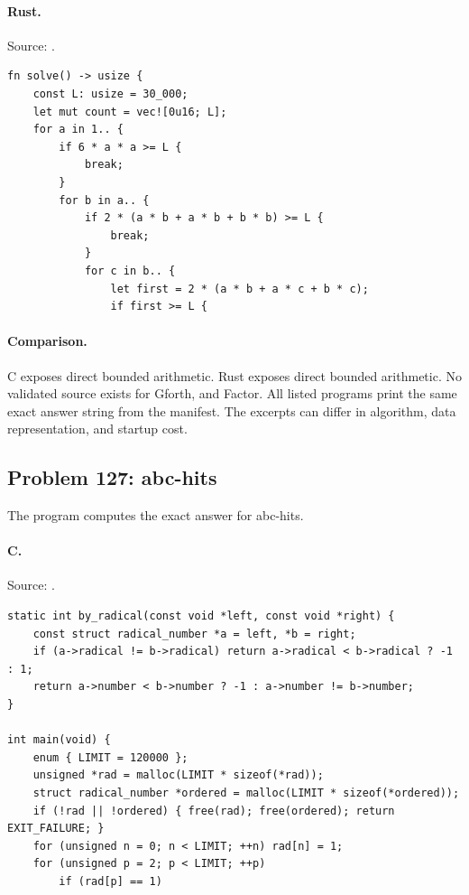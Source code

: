 \paragraph{Rust.} Source: .
\begin{lstlisting}
fn solve() -> usize {
    const L: usize = 30_000;
    let mut count = vec![0u16; L];
    for a in 1.. {
        if 6 * a * a >= L {
            break;
        }
        for b in a.. {
            if 2 * (a * b + a * b + b * b) >= L {
                break;
            }
            for c in b.. {
                let first = 2 * (a * b + a * c + b * c);
                if first >= L {
\end{lstlisting}

\paragraph{Comparison.}
C exposes direct bounded arithmetic. Rust exposes direct bounded arithmetic.
No validated source exists for Gforth, and Factor.
All listed programs print the same exact answer string from the manifest. The excerpts can differ in algorithm, data representation, and startup cost.

\subsection{Problem 127: abc-hits}
\label{walkthrough:p127}
The program computes the exact answer for abc-hits.

\paragraph{C.} Source: .
\begin{lstlisting}
static int by_radical(const void *left, const void *right) {
    const struct radical_number *a = left, *b = right;
    if (a->radical != b->radical) return a->radical < b->radical ? -1 : 1;
    return a->number < b->number ? -1 : a->number != b->number;
}

int main(void) {
    enum { LIMIT = 120000 };
    unsigned *rad = malloc(LIMIT * sizeof(*rad));
    struct radical_number *ordered = malloc(LIMIT * sizeof(*ordered));
    if (!rad || !ordered) { free(rad); free(ordered); return EXIT_FAILURE; }
    for (unsigned n = 0; n < LIMIT; ++n) rad[n] = 1;
    for (unsigned p = 2; p < LIMIT; ++p)
        if (rad[p] == 1)
\end{lstlisting}

